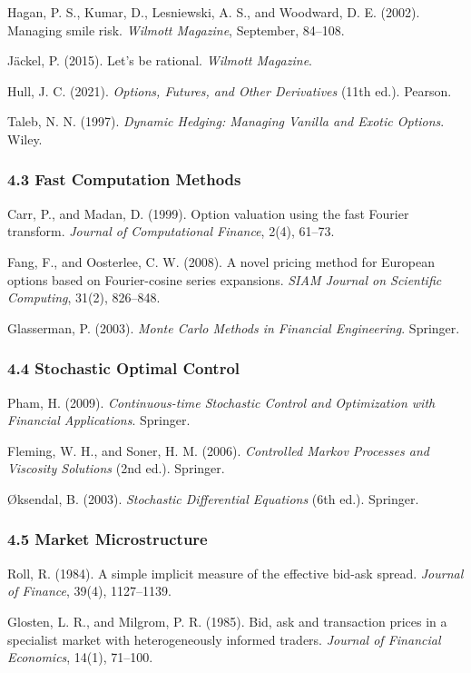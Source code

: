 \documentclass[
]{article}
\begin{document}
Hagan, P. S., Kumar, D., Lesniewski, A. S., and Woodward, D. E. (2002).
Managing smile risk. \emph{Wilmott Magazine}, September, 84--108.

Jäckel, P. (2015). Let's be rational. \emph{Wilmott Magazine}.

Hull, J. C. (2021). \emph{Options, Futures, and Other Derivatives} (11th
ed.). Pearson.

Taleb, N. N. (1997). \emph{Dynamic Hedging: Managing Vanilla and Exotic
Options}. Wiley.

\subsubsection{4.3 Fast Computation
Methods}\label{fast-computation-methods}

Carr, P., and Madan, D. (1999). Option valuation using the fast Fourier
transform. \emph{Journal of Computational Finance}, 2(4), 61--73.

Fang, F., and Oosterlee, C. W. (2008). A novel pricing method for
European options based on Fourier-cosine series expansions. \emph{SIAM
Journal on Scientific Computing}, 31(2), 826--848.

Glasserman, P. (2003). \emph{Monte Carlo Methods in Financial
Engineering}. Springer.

\subsubsection{4.4 Stochastic Optimal
Control}\label{stochastic-optimal-control}

Pham, H. (2009). \emph{Continuous-time Stochastic Control and
Optimization with Financial Applications}. Springer.

Fleming, W. H., and Soner, H. M. (2006). \emph{Controlled Markov
Processes and Viscosity Solutions} (2nd ed.). Springer.

Øksendal, B. (2003). \emph{Stochastic Differential Equations} (6th ed.).
Springer.

\subsubsection{4.5 Market Microstructure}\label{market-microstructure}

Roll, R. (1984). A simple implicit measure of the effective bid-ask
spread. \emph{Journal of Finance}, 39(4), 1127--1139.

Glosten, L. R., and Milgrom, P. R. (1985). Bid, ask and transaction
prices in a specialist market with heterogeneously informed traders.
\emph{Journal of Financial Economics}, 14(1), 71--100.
\end{document}
